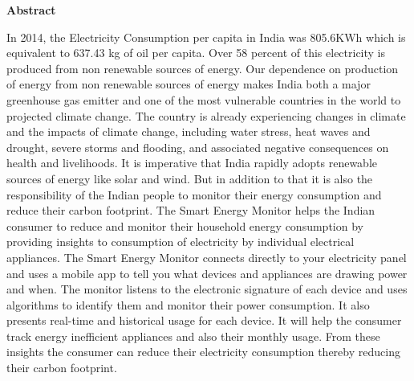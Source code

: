 \begin{titlepage}
\thispagestyle{empty}
\begin{center}
\begin{LARGE}
\bf {Abstract}
\end{LARGE}

\end{center}
\large
In 2014, the Electricity Consumption per capita in India was 805.6KWh which is equivalent to 637.43 kg of oil per capita. Over 58 percent of this electricity is produced from non renewable sources of energy. Our dependence on production of energy from non renewable sources of energy makes India both a major greenhouse gas emitter and one of the most vulnerable countries in the world to projected climate change. The country is already experiencing changes in climate and the impacts of climate change, including water stress, heat waves and drought, severe storms and flooding, and associated negative consequences on health and livelihoods. It is imperative that India rapidly adopts renewable sources of energy like solar and wind. But in addition to that it is also the responsibility of the Indian people to monitor their energy consumption and reduce their carbon footprint. 
The Smart Energy Monitor helps the Indian consumer to reduce and monitor their household energy consumption by providing insights to consumption of electricity by individual electrical appliances. The Smart Energy Monitor  connects directly to your electricity panel and uses a mobile app to tell you what devices and appliances are drawing power and when. The monitor listens to the electronic signature of each device and uses algorithms to identify them and monitor their power consumption. It also presents real-time and historical usage for each device. It will help the consumer track energy inefficient appliances and also their monthly usage. From these insights the consumer can reduce their electricity consumption thereby reducing their carbon footprint. 





\end{titlepage}